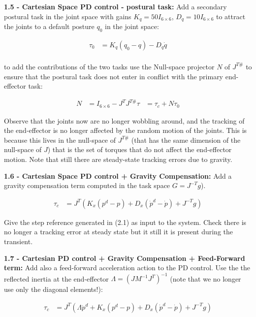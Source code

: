 \documentclass[11pt]{article}
\begin{document}
\quad

\noindent
\textbf{1.5 - Cartesian Space PD control - postural task:}
Add  a secondary postural task in the joint space with  gains $K_q= 50 I_{6 \times6}$,   $D_q = 10I_{6 \times6}$ to attract the joints to a default posture $q_0$ in the joint space:

\begin{align}
\tau_0& = K_q(q_0-q) - D_q\dot{q}\\
\end{align}

to add the contributions of the two  tasks use the Null-space projector $N$ of $J^{T\#}$ to ensure that the postural task does not enter in conflict with the primary end-effector task:

\begin{align}
N & = I_{6 \times 6} - J^T J^{T\#}
\tau& = \tau_c  + N\tau_0 
\end{align}

Observe that the joints now are no longer wobbling around, and the tracking of the end-effector is no longer affected by the random motion of the joints. 
This is because this lives in the null-space of $J^{T\#}$ (that has the same dimension of the null-space of $J$) that is the set of torques that do not affect the end-effector motion. Note that still there are steady-state tracking errors due to gravity.

\quad

\noindent
\textbf{1.6 - Cartesian Space PD control + Gravity Compensation:}
Add a gravity compensation term computed in the task space $G= J^{-T}g$).

\begin{align}
\tau_c & = J^T\left( K_x(p^d - p) + D_x(\dot{p}^d -\dot{p})  + J^{-T}g \right)
\end{align}

Give the step reference generated in (2.1) as input to the system. 
Check there is no longer a  tracking error at steady state but  it still it is present during the transient. 

\quad

\noindent
\textbf{1.7 - Cartesian PD control  + Gravity Compensation + Feed-Forward term:}
Add also a feed-forward acceleration action to the PD control. Use the the reflected inertia
at the end-effector $\Lambda = (J M^{-1} J^T)^{-1}$ (note that we no longer use only the diagonal elements!):

\begin{align}
\tau_c & = J^T\left( \Lambda \ddot{p}^d + K_x(p^d - p) + D_x(\dot{p}^d -\dot{p})  + J^{-T}g \right)
\end{align}
\end{document}

